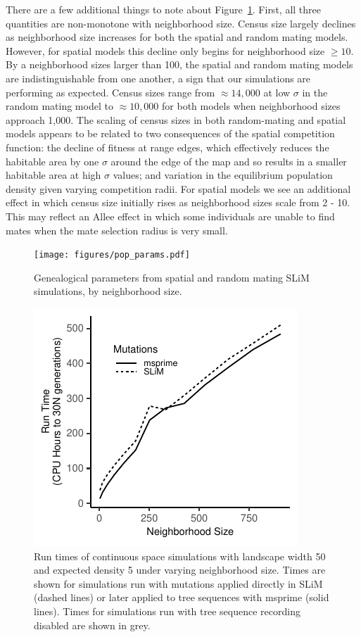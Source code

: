 \documentclass[10pt,twoside,lineno,hidelinks]{preprint}
\begin{document}
There are a few additional things to note about Figure~\ref{fig:genparams}. 
First, all three quantities are non-monotone with neighborhood size. 
Census size largely declines as neighborhood size increases for both the spatial and random mating models. 
However, for spatial models this decline only begins for neighborhood size $\geq 10$. 
By a neighborhood sizes larger than 100, the spatial and random mating models are indistinguishable from one another, 
a sign that our simulations are performing as expected. 
Census sizes range from $\approx 14,000$ at low $\sigma$ in the random mating model to $\approx 10,000$ for both models when neighborhood sizes approach 1,000. The scaling of census sizes in both random-mating and spatial models appears to be related to two consequences of the spatial competition function: the decline of fitness at range edges, which effectively reduces the habitable area by one $\sigma$ around the edge of the map and so results in a smaller habitable area at high $\sigma$ values; and variation in the equilibrium population density given varying competition radii. For spatial models we see an additional effect in which census size initially rises as neighborhood sizes scale from 2 - 10. This may reflect an Allee effect \citep{Allee1949} in which some individuals are unable to find mates when the mate selection radius is very small.  

\begin{figure}[htbp]
\centering
\texttt{[image: figures/pop\_params.pdf]}
\caption{Genealogical parameters from spatial and random mating SLiM simulations, by neighborhood size.}
\label{fig:genparams}
\end{figure}

\begin{figure}[htbp]
\centering
\includegraphics{figures/runtimes.pdf}
\caption{Run times of continuous space simulations with landscape width 50 and expected density 5 under varying neighborhood size. Times are shown for simulations run with mutations applied directly in SLiM (dashed lines) or later applied to tree sequences with msprime (solid lines). Times for simulations run with tree sequence recording disabled are shown in grey.}
\label{fig:runtimes}
\end{figure}
\end{document}
